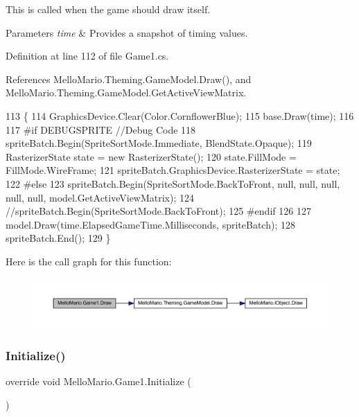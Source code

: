 This is called when the game should draw itself. 


\begin{DoxyParams}{Parameters}
{\em time} & Provides a snapshot of timing values.\\
\hline
\end{DoxyParams}


Definition at line 112 of file Game1.\+cs.



References Mello\+Mario.\+Theming.\+Game\+Model.\+Draw(), and Mello\+Mario.\+Theming.\+Game\+Model.\+Get\+Active\+View\+Matrix.


\begin{DoxyCode}
113         \{
114             GraphicsDevice.Clear(Color.CornflowerBlue);
115             base.Draw(time);
116 
117 \textcolor{preprocessor}{#if DEBUGSPRITE //Debug Code}
118             spriteBatch.Begin(SpriteSortMode.Immediate, BlendState.Opaque);
119             RasterizerState state = \textcolor{keyword}{new} RasterizerState();
120             state.FillMode = FillMode.WireFrame;
121             spriteBatch.GraphicsDevice.RasterizerState = state;
122 \textcolor{preprocessor}{#else}
123             spriteBatch.Begin(SpriteSortMode.BackToFront, null, null, null, null, null, 
      model.GetActiveViewMatrix);
124             \textcolor{comment}{//spriteBatch.Begin(SpriteSortMode.BackToFront);}
125 \textcolor{preprocessor}{#endif}
126 
127             model.Draw(time.ElapsedGameTime.Milliseconds, spriteBatch);
128             spriteBatch.End();
129         \}
\end{DoxyCode}
Here is the call graph for this function\+:
\nopagebreak
\begin{figure}[H]
\begin{center}
\leavevmode
\includegraphics[width=350pt]{classMelloMario_1_1Game1_acf83ef72d18163996d51454769a2dcfd_cgraph}
\end{center}
\end{figure}
\mbox{\label{classMelloMario_1_1Game1_a6fe8c72f1e2e61499a069f0440c6d75a}} 
\subsubsection{Initialize()}
{\footnotesize\ttfamily override void Mello\+Mario.\+Game1.\+Initialize (\begin{DoxyParamCaption}{ }\end{DoxyParamCaption})\hspace{0.3cm}{\ttfamily [protected]}}




